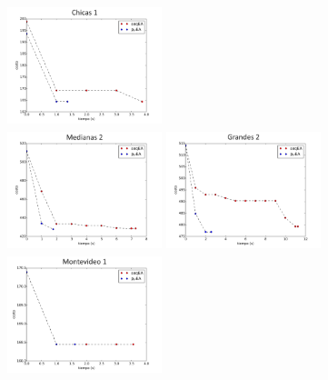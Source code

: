 \begin{columns}[t]
\centering
\includegraphics[width=4.5cm,height=3.5cm]{./evaluacion_experimental/fitness_sobre_tiempo/chicas_1.png}\\
\includegraphics[width=4.5cm,height=3.5cm]{./evaluacion_experimental/fitness_sobre_tiempo/medianas_2.png}
\centering
\includegraphics[width=4.5cm,height=3.5cm]{./evaluacion_experimental/fitness_sobre_tiempo/grandes_2.png}\\
\includegraphics[width=4.5cm,height=3.5cm]{./evaluacion_experimental/fitness_sobre_tiempo/montevideo_1.png}
\end{columns}